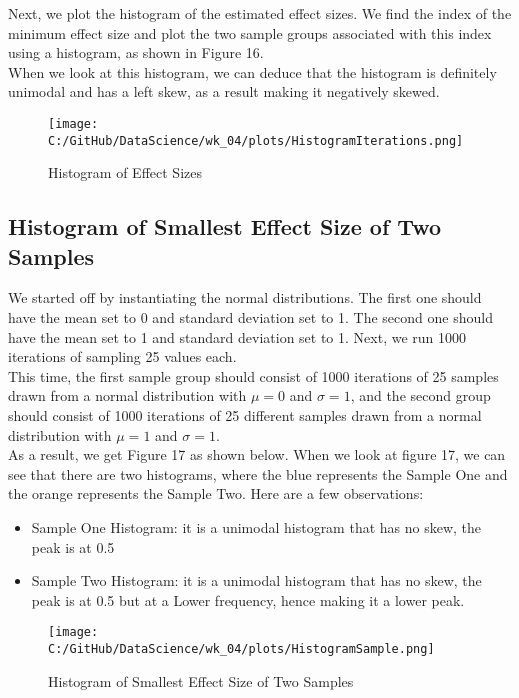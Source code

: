\documentclass[a4paper,twocolumn]{article}
\begin{document}
Next, we plot the histogram of the estimated effect sizes. We find the index of the minimum effect size and 
plot the two sample groups associated with this index using a histogram, as shown in Figure 16. \\

When we look at this histogram, we can deduce that the histogram is definitely unimodal and has a left skew,
as a result making it negatively skewed. 

\begin{figure}[htbp] 
    \centering
    \noindent
    \texttt{[image: C:/GitHub/DataScience/wk\_04/plots/HistogramIterations.png]}
    \caption{Histogram of Effect Sizes} 
\end{figure}

\subsection{Histogram of Smallest Effect Size of Two Samples }

We started off by instantiating the normal distributions. The first one should have the mean set to 0 and
standard deviation set to 1. The second one should have the mean set to 1 and standard deviation set to 1. 
Next, we run 1000 iterations of sampling 25 values each. \\

This time, the first sample group should consist of 1000 iterations of 25 samples drawn from a normal distribution 
with $\mu = 0$ and $\sigma = 1$, and the second group should consist of 1000 iterations of 25 different samples 
drawn from a normal distribution with $\mu = 1$ and $\sigma = 1$. \\

As a result, we get Figure 17 as shown below. When we look at figure 17, we can see that there are two histograms,
where the blue represents the Sample One and the orange represents the Sample Two. Here are a few observations:
\begin{itemize}
    \item Sample One Histogram: it is a unimodal histogram that has no skew, the peak is at 0.5
    \item Sample Two Histogram: it is a unimodal histogram that has no skew, the peak is at 0.5 but at a Lower
    frequency, hence making it a lower peak. 
\end{itemize}

\begin{figure}[htbp] 
    \centering
    \noindent
    \texttt{[image: C:/GitHub/DataScience/wk\_04/plots/HistogramSample.png]}
    \caption{Histogram of Smallest Effect Size of Two Samples} 
\end{figure}
\end{document}
